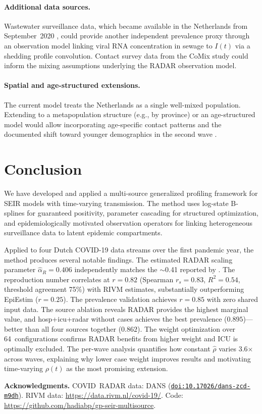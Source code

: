 \documentclass[11pt]{article}
\newcommand{\doi}[1]{\href{https://doi.org/#1}{\texttt{doi:#1}}}
\begin{document}
\paragraph{Additional data sources.} Wastewater surveillance data, which became available in the Netherlands from September~2020 \citep{Geubbels2023}, could provide another independent prevalence proxy through an observation model linking viral RNA concentration in sewage to $I(t)$ via a shedding profile convolution. Contact survey data from the CoMix study \citep{Geubbels2023} could inform the mixing assumptions underlying the RADAR observation model.

\paragraph{Spatial and age-structured extensions.} The current model treats the Netherlands as a single well-mixed population. Extending to a metapopulation structure (e.g., by province) or an age-structured model would allow incorporating age-specific contact patterns and the documented shift toward younger demographics in the second wave \citep{Dongelmans2022}.


\section{Conclusion}\label{sec:conclusion}

We have developed and applied a multi-source generalized profiling framework for SEIR models with time-varying transmission. The method uses log-state B-splines for guaranteed positivity, parameter cascading for structured optimization, and epidemiologically motivated observation operators for linking heterogeneous surveillance data to latent epidemic compartments.

Applied to four Dutch COVID-19 data streams over the first pandemic year, the method produces several notable findings. The estimated RADAR scaling parameter $\hat\alpha_R=0.406$ independently matches the $\sim$0.41 reported by \citet{SchootUiterkamp2025}. The reproduction number correlates at $r=0.82$ (Spearman $r_s=0.83$, $R^2=0.54$, threshold agreement 75\%) with RIVM estimates, substantially outperforming EpiEstim ($r=0.25$). The prevalence validation achieves $r=0.85$ with zero shared input data. The source ablation reveals RADAR provides the highest marginal value, and hosp+icu+radar without cases achieves the best prevalence ($0.895$)---better than all four sources together ($0.862$). The weight optimization over 64~configurations confirms RADAR benefits from higher weight and ICU is optimally excluded. The per-wave analysis quantifies how constant $\hat\rho$ varies 3.6$\times$ across waves, explaining why lower case weight improves results and motivating time-varying $\rho(t)$ as the most promising extension.

\bigskip
\noindent\textbf{Acknowledgments.}
COVID~RADAR data: DANS (\doi{10.17026/dans-zcd-m9dh}).
RIVM data: \url{https://data.rivm.nl/covid-19/}.
Code: \url{https://github.com/hadiabp/gp-seir-multisource}.



\end{document}
